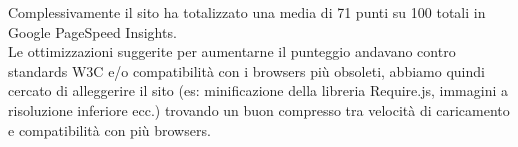 \begin{flushleft}
Complessivamente il sito ha totalizzato una media di 71 punti su 100 totali in Google PageSpeed Insights.\\
 Le ottimizzazioni suggerite per aumentarne il punteggio andavano contro standards W3C e/o compatibilità con i browsers più obsoleti, abbiamo quindi cercato di alleggerire il sito (es: minificazione della libreria Require.js, immagini a risoluzione inferiore ecc.) trovando un buon compresso tra velocità di caricamento e compatibilità con più browsers.
\end{flushleft}